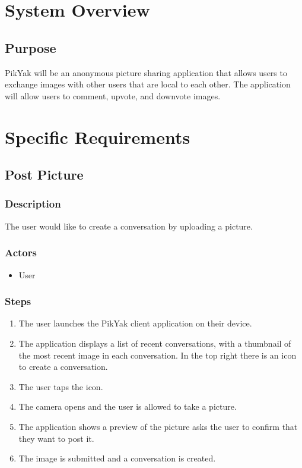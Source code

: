 \documentclass[11pt]{scrartcl}
\let\stdsection\section
\renewcommand\section{\newpage\stdsection}
\begin{document}
\section{System Overview}
    \subsection{Purpose}
        PikYak will be an anonymous picture sharing application that allows users to exchange images with other users that are local to each other.  The application will allow users to comment, upvote, and downvote images.

\section{Specific Requirements}
    \subsection{Post Picture}
        \subsubsection{Description}
            The user would like to create a conversation by uploading a picture.
        \subsubsection{Actors}
            \begin{itemize}
                \item User
            \end{itemize}
        \subsubsection{Steps}
            \begin{enumerate}
                \item The user launches the PikYak client application on their device.
                \item The application displays a list of recent conversations, with a thumbnail of the most recent image in each conversation. In the top right there is an icon to create a conversation.
                \item The user taps the icon.
                \item The camera opens and the user is allowed to take a picture.
                \item The application shows a preview of the picture asks the user to confirm that they want to post it.
                \item The image is submitted and a conversation is created.
            \end{enumerate}
    
\end{document}
